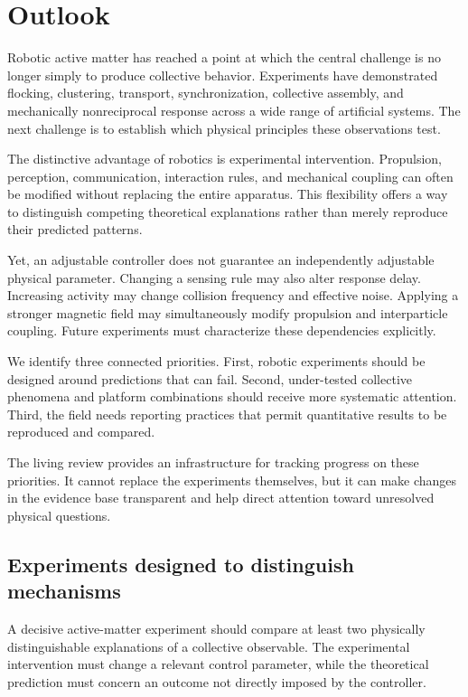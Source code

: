 \section{Outlook}
\label{sec:outlook}

Robotic active matter has reached a point at which the central
challenge is no longer simply to produce collective behavior.
Experiments have demonstrated flocking, clustering, transport,
synchronization, collective assembly, and mechanically
nonreciprocal response across a wide range of artificial
systems. The next challenge is to establish which physical
principles these observations test.

The distinctive advantage of robotics is experimental
intervention. Propulsion, perception, communication,
interaction rules, and mechanical coupling can often
be modified without replacing the entire apparatus.
This flexibility offers a way to distinguish competing
theoretical explanations rather than merely reproduce
their predicted patterns.

Yet, an adjustable controller does not guarantee an
independently adjustable physical parameter. Changing
a sensing rule may also alter response delay.
Increasing activity may change collision frequency
and effective noise. Applying a stronger magnetic
field may simultaneously modify propulsion and
interparticle coupling. Future experiments must
characterize these dependencies explicitly.

We identify three connected priorities. First, robotic
experiments should be designed around predictions
that can fail. Second, under-tested collective
phenomena and platform combinations should receive
more systematic attention. Third, the field needs
reporting practices that permit quantitative results
to be reproduced and compared.

The living review provides an infrastructure for
tracking progress on these priorities. It cannot
replace the experiments themselves, but it can
make changes in the evidence base transparent
and help direct attention toward unresolved
physical questions.

\subsection{Experiments designed to distinguish mechanisms}
\label{sec:outlook-decisive}

A decisive active-matter experiment should compare
at least two physically distinguishable explanations
of a collective observable. The experimental
intervention must change a relevant control
parameter, while the theoretical prediction
must concern an outcome not directly imposed
by the controller.

